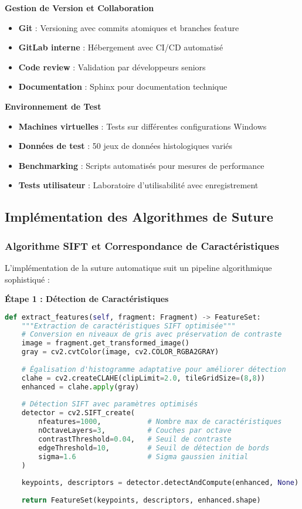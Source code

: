 \documentclass[12pt,a4paper]{report}
\begin{document}
\textbf{Gestion de Version et Collaboration}
\begin{itemize}
\item \textbf{Git} : Versioning avec commits atomiques et branches feature
\item \textbf{GitLab interne} : Hébergement avec CI/CD automatisé
\item \textbf{Code review} : Validation par développeurs seniors
\item \textbf{Documentation} : Sphinx pour documentation technique
\end{itemize}

\textbf{Environnement de Test}
\begin{itemize}
\item \textbf{Machines virtuelles} : Tests sur différentes configurations Windows
\item \textbf{Données de test} : 50 jeux de données histologiques variés
\item \textbf{Benchmarking} : Scripts automatisés pour mesures de performance
\item \textbf{Tests utilisateur} : Laboratoire d'utilisabilité avec enregistrement
\end{itemize}

\subsection{Implémentation des Algorithmes de Suture}

\subsubsection{Algorithme SIFT et Correspondance de Caractéristiques}

L'implémentation de la suture automatique suit un pipeline algorithmique sophistiqué :

\textbf{Étape 1 : Détection de Caractéristiques}

\begin{lstlisting}[language=Python]
def extract_features(self, fragment: Fragment) -> FeatureSet:
    """Extraction de caractéristiques SIFT optimisée"""
    # Conversion en niveaux de gris avec préservation de contraste
    image = fragment.get_transformed_image()
    gray = cv2.cvtColor(image, cv2.COLOR_RGBA2GRAY)
    
    # Égalisation d'histogramme adaptative pour améliorer détection
    clahe = cv2.createCLAHE(clipLimit=2.0, tileGridSize=(8,8))
    enhanced = clahe.apply(gray)
    
    # Détection SIFT avec paramètres optimisés
    detector = cv2.SIFT_create(
        nfeatures=1000,           # Nombre max de caractéristiques
        nOctaveLayers=3,          # Couches par octave
        contrastThreshold=0.04,   # Seuil de contraste
        edgeThreshold=10,         # Seuil de détection de bords
        sigma=1.6                 # Sigma gaussien initial
    )
    
    keypoints, descriptors = detector.detectAndCompute(enhanced, None)
    
    return FeatureSet(keypoints, descriptors, enhanced.shape)
\end{lstlisting}
\end{document}
